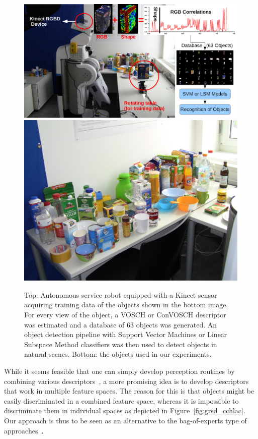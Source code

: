 \documentclass[letterpaper, 10 pt, conference]{sty/ieeeconf}
\begin{document}
\begin{figure}[tb!]
  \begin{center}
    \includegraphics[width=.99\columnwidth]{figures/firstpage/firstpage.pdf}
    \includegraphics[width=.99\columnwidth]{figures/objects/objects.jpg}
    \caption{Top: Autonomous service robot equipped with a Kinect sensor
    acquiring training data of the objects shown in the bottom image. For 
  every view of the object, a VOSCH or ConVOSCH descriptor was estimated and a database
of 63 objects was generated. An object detection pipeline with Support Vector
Machines or Linear Subspace Method classifiers was then used to detect objects
in natural scenes. Bottom: the objects used in our experiments.}
    \label{fig:robot}
  \end{center}
\end{figure}

While it seems feasible that one can simply develop perception routines by combining
various descriptors~\cite{stueckler10combining, GRSD10Humanoids}, a more promising idea 
is to develop descriptors that work in multiple feature spaces. The reason for this is 
that objects might be easily discriminated in a combined feature space, whereas it is impossible 
to discriminate them in individual spaces as depicted in Figure~\ref{fig:grsd_cchlac}.
Our approach is thus to be seen as an alternative to the bag-of-experts type
of approaches~\cite{Varma07learningthe}.
\end{document}
